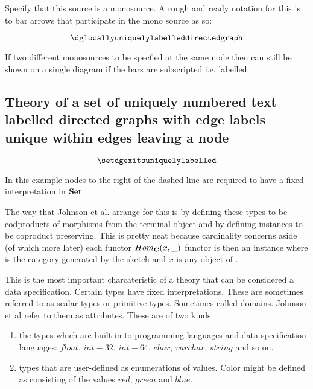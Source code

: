 \documentclass[10pt,a4paper]{article}
\theoremstyle{remark}
\begin{document}
Specify  that this source  is  a monosource. A 
rough and ready notation for this is to bar arrows that participate in the mono source as so:

\begin{displaymath}
\dglocallyuniquelylabelleddirectedgraph
\end{displaymath}

If two different monosources to be specfied at the same node then can still be shown 
on a single diagram if the bars are subscripted i.e. labelled.



\subsection*{Theory of a set of uniquely numbered text labelled directed graphs with edge labels unique within edges leaving a node}

\begin{displaymath}
\setdgexitsuniquelylabelled
\end{displaymath}

In this example nodes to the right of the dashed line are required to have a fixed interpretation in $\textbf{Set}$.

The way that Johnson et al. arrange for this is by defining these types to be codproducts of morphisms 
from the terminal object and by defining instances to be coproduct preserving. 
This is pretty neat because cardinality concerns aside (of which more later) 
each functor $Hom_{\textbf{C}}(x,\_)$ functor is then an instance where \catcw is the category generated by the sketch and $x$ is any object of \catc.

This is the most important charcateristic of a theory that can be considered a data specification. 
Certain types have fixed interpretations. These are sometimes referred to as scalar types or primitive types.
Sometimes called domains. Johnson et al refer to them as attributes.
These are of two kinds
\begin{enumerate}
\item the types which are built in to programming languages and data specification languages:  $float$, $int-32$, $int-64$, $char$, $varchar$, $string$ and so on.
\item types that are user-defined as enumerations of values. Color might be defined as 
consisting of the values $red$, $green$ and $blue$. 
\end{enumerate}
\end{document}
